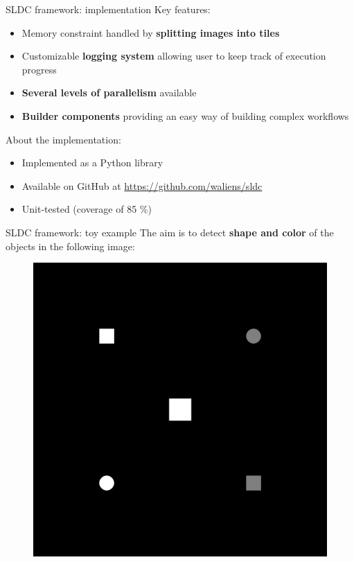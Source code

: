 \documentclass{beamer}
\begin{document}
\begin{frame}{SLDC framework: implementation}
	Key features:
	\begin{itemize}
		\item Memory constraint handled by \textbf{splitting images into tiles}
		\item Customizable \textbf{logging system} allowing user to keep track of execution progress
		\item \textbf{Several levels of parallelism} available 
		\item \textbf{Builder components} providing an easy way of building complex workflows
	\end{itemize}
	\vspace{0.5cm}
	About the implementation: 
	\begin{itemize}
		\item Implemented as a Python library
		\item Available on GitHub at {\small\url{https://github.com/waliens/sldc}}
		\item Unit-tested (coverage of 85 \%)
		\vspace{0.5cm}
	\end{itemize}
\end{frame}

\begin{frame}{SLDC framework: toy example}
	The aim is to detect \textbf{shape and color} of the objects in the following image:
	\vfill
	\begin{figure}
		\includegraphics[scale=0.03]{images/toy_example.png}
	\end{figure}
	\vfill
\end{frame}
\end{document}
